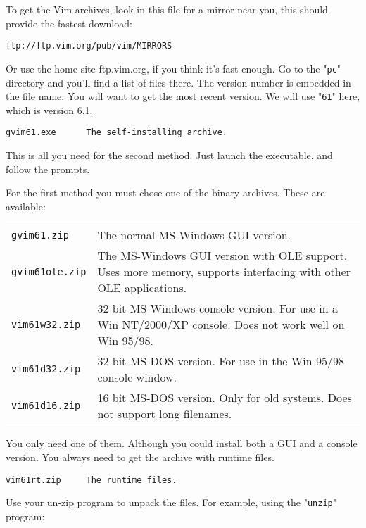 To get the Vim archives, look in this file for a mirror near you, this should provide the fastest download:

\begin{Verbatim}[samepage=true]
    ftp://ftp.vim.org/pub/vim/MIRRORS 
\end{Verbatim}

Or use the home site ftp.vim.org, if you think it's fast enough.
Go to the "\texttt{pc}" directory and you'll find a list of files there.
The version number is embedded in the file name.
You will want to get the most recent version.
We will use "\texttt{61}" here, which is version 6.1.

\begin{Verbatim}[samepage=true]
    gvim61.exe      The self-installing archive.
\end{Verbatim}

This is all you need for the second method.
Just launch the executable, and follow the prompts.

For the first method you must chose one of the binary archives.
These are available:

\begin{center} \begin{tabularx}{\textwidth}{l X}
				\texttt{gvim61.zip} & The normal MS-Windows GUI version. \\
				\texttt{gvim61ole.zip} & The MS-Windows GUI version with OLE support.  Uses more memory, supports interfacing with other OLE applications. \\
				\texttt{vim61w32.zip} & 32 bit MS-Windows console version.  For use in a Win NT/2000/XP console.  Does not work well on Win 95/98. \\
				\texttt{vim61d32.zip} & 32 bit MS-DOS version.  For use in the Win 95/98 console window. \\
				\texttt{vim61d16.zip} & 16 bit MS-DOS version.  Only for old systems.  Does not support long filenames. \\
\end{tabularx} \end{center}

You only need one of them.
Although you could install both a GUI and a console version.
You always need to get the archive with runtime files.

\begin{Verbatim}[samepage=true]
    vim61rt.zip     The runtime files.
\end{Verbatim}

Use your un-zip program to unpack the files.
For example, using the "\texttt{unzip}" program:

